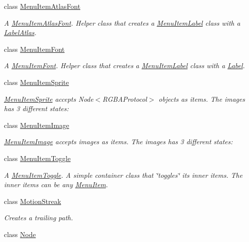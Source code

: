 \begin{DoxyCompactItemize}
class \hyperlink{classMenuItemAtlasFont}{Menu\+Item\+Atlas\+Font}
\begin{DoxyCompactList}\small\item\em A \hyperlink{classMenuItemAtlasFont}{Menu\+Item\+Atlas\+Font}. Helper class that creates a \hyperlink{classMenuItemLabel}{Menu\+Item\+Label} class with a \hyperlink{classLabelAtlas}{Label\+Atlas}. \end{DoxyCompactList}\item 
class \hyperlink{classMenuItemFont}{Menu\+Item\+Font}
\begin{DoxyCompactList}\small\item\em A \hyperlink{classMenuItemFont}{Menu\+Item\+Font}. Helper class that creates a \hyperlink{classMenuItemLabel}{Menu\+Item\+Label} class with a \hyperlink{classLabel}{Label}. \end{DoxyCompactList}\item 
class \hyperlink{classMenuItemSprite}{Menu\+Item\+Sprite}
\begin{DoxyCompactList}\small\item\em \hyperlink{classMenuItemSprite}{Menu\+Item\+Sprite} accepts Node$<$\+R\+G\+B\+A\+Protocol$>$ objects as items. The images has 3 different states\+: \end{DoxyCompactList}\item 
class \hyperlink{classMenuItemImage}{Menu\+Item\+Image}
\begin{DoxyCompactList}\small\item\em \hyperlink{classMenuItemImage}{Menu\+Item\+Image} accepts images as items. The images has 3 different states\+: \end{DoxyCompactList}\item 
class \hyperlink{classMenuItemToggle}{Menu\+Item\+Toggle}
\begin{DoxyCompactList}\small\item\em A \hyperlink{classMenuItemToggle}{Menu\+Item\+Toggle}. A simple container class that \char`\"{}toggles\char`\"{} it\textquotesingle{}s inner items. The inner items can be any \hyperlink{classMenuItem}{Menu\+Item}. \end{DoxyCompactList}\item 
class \hyperlink{classMotionStreak}{Motion\+Streak}
\begin{DoxyCompactList}\small\item\em Creates a trailing path. \end{DoxyCompactList}\item 
class \hyperlink{classNode}{Node}

\end{DoxyCompactItemize}
